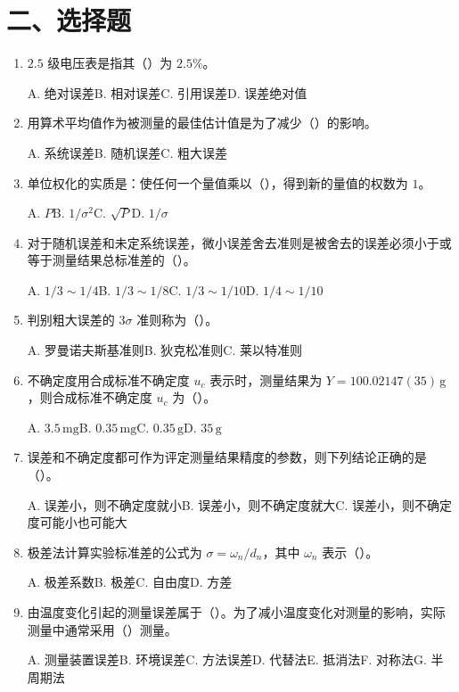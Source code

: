 \documentclass[UTF8,12pt,a4paper]{ctexart}
\begin{document}
\section*{二、选择题}
\begin{enumerate}[label=\arabic*、]
\item $2.5$ 级电压表是指其（\quad）为 $2.5\%$。
\par\noindent A. 绝对误差\quad B. 相对误差\quad C. 引用误差\quad D. 误差绝对值
\item 用算术平均值作为被测量的最佳估计值是为了减少（\quad）的影响。
\par\noindent A. 系统误差\quad B. 随机误差\quad C. 粗大误差
\item 单位权化的实质是：使任何一个量值乘以（\quad），得到新的量值的权数为 $1$。
\par\noindent A. $P$\quad B. $1/\sigma^2$\quad C. $\sqrt{P}$\quad D. $1/\sigma$
\item 对于随机误差和未定系统误差，微小误差舍去准则是被舍去的误差必须小于或等于测量结果总标准差的（\quad）。
\par\noindent A. $1/3\sim1/4$\quad B. $1/3\sim1/8$\quad C. $1/3\sim1/10$\quad D. $1/4\sim1/10$
\item 判别粗大误差的 $3\sigma$ 准则称为（\quad）。
\par\noindent A. 罗曼诺夫斯基准则\quad B. 狄克松准则\quad C. 莱以特准则
\item 不确定度用合成标准不确定度 $u_c$ 表示时，测量结果为 $Y=100.02147(35)\,\mathrm{g}$，则合成标准不确定度 $u_c$ 为（\quad）。
\par\noindent A. $3.5\,\mathrm{mg}$\quad B. $0.35\,\mathrm{mg}$\quad C. $0.35\,\mathrm{g}$\quad D. $35\,\mathrm{g}$
\item 误差和不确定度都可作为评定测量结果精度的参数，则下列结论正确的是（\quad）。
\par\noindent A. 误差小，则不确定度就小\quad B. 误差小，则不确定度就大\quad C. 误差小，则不确定度可能小也可能大
\item 极差法计算实验标准差的公式为 $\sigma=\omega_n/d_n$，其中 $\omega_n$ 表示（\quad）。
\par\noindent A. 极差系数\quad B. 极差\quad C. 自由度\quad D. 方差
\item 由温度变化引起的测量误差属于（\quad）。为了减小温度变化对测量的影响，实际测量中通常采用（\quad）测量。
\par\noindent A. 测量装置误差\quad B. 环境误差\quad C. 方法误差\quad D. 代替法\quad E. 抵消法\quad F. 对称法\quad G. 半周期法
\end{enumerate}
\end{document}

